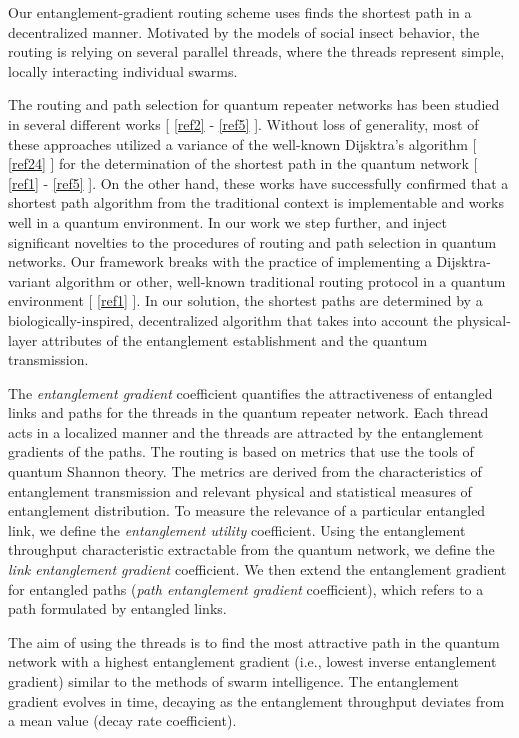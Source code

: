 \documentclass[11pt]{article}%
\newcommand*{\cref}[1]{%
  \begingroup
    \hypersetup{
      linkcolor=linkequation,
      linkbordercolor=linkequation,
    }%
    \ref{#1}%
  \endgroup
}
\begin{document}
Our entanglement-gradient routing scheme uses finds the shortest path in a decentralized manner. Motivated by the models of social insect behavior, the routing is relying on several parallel threads, where the threads represent simple, locally interacting individual swarms. 

The routing and path selection for quantum repeater networks has been studied in several different works [\cref{ref2}-\cref{ref5}]. Without loss of generality, most of these approaches utilized a variance of the well-known Dijsktra's algorithm [\cref{ref24}] for the determination of the shortest path in the quantum network [\cref{ref1}-\cref{ref5}]. On the other hand, these works have successfully confirmed that a shortest path algorithm from the traditional context is implementable and works well in a quantum environment. In our work we step further, and inject significant novelties to the procedures of routing and path selection in quantum networks. Our framework breaks with the practice of implementing a Dijsktra-variant algorithm or other, well-known traditional routing protocol in a quantum environment [\cref{ref1}]. In our solution, the shortest paths are determined by a biologically-inspired, decentralized algorithm that takes into account the physical-layer attributes of the entanglement establishment and the quantum transmission. 

The \textit{entanglement gradient} coefficient quantifies the attractiveness of entangled links and paths for the threads in the quantum repeater network. Each thread acts in a localized manner and the threads are attracted by the entanglement gradients of the paths. The routing is based on metrics that use the tools of quantum Shannon theory. The metrics are derived from the characteristics of entanglement transmission and relevant physical and statistical measures of entanglement distribution. To measure the relevance of a particular entangled link, we define the \textit{entanglement utility} coefficient. Using the entanglement throughput characteristic extractable from the quantum network, we define the \textit{link entanglement gradient} coefficient. We then extend the entanglement gradient for entangled paths (\textit{path entanglement gradient} coefficient), which refers to a path formulated by entangled links. 

The aim of using the threads is to find the most attractive path in the quantum network with a highest entanglement gradient (i.e., lowest inverse entanglement gradient) similar to the methods of swarm intelligence. The entanglement gradient evolves in time, decaying as the entanglement throughput deviates from a mean value (decay rate coefficient). 
\end{document}
